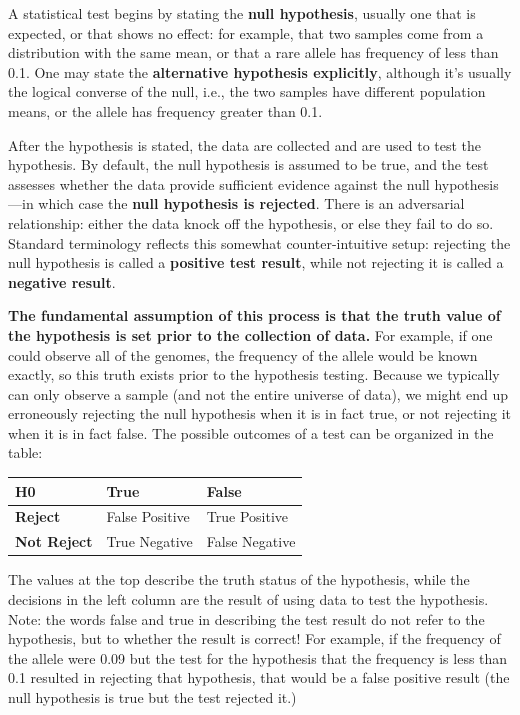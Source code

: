 \documentclass[
  letterpaper,
  DIV=11,
  numbers=noendperiod]{scrreprt}
\begin{document}
A statistical test begins by stating the \textbf{null hypothesis},
usually one that is expected, or that shows no effect: for example, that
two samples come from a distribution with the same mean, or that a rare
allele has frequency of less than 0.1. One may state the
\textbf{alternative hypothesis explicitly}, although it's usually the
logical converse of the null, i.e., the two samples have different
population means, or the allele has frequency greater than 0.1.

After the hypothesis is stated, the data are collected and are used to
test the hypothesis. By default, the null hypothesis is assumed to be
true, and the test assesses whether the data provide sufficient evidence
against the null hypothesis---in which case the \textbf{null hypothesis
is rejected}. There is an adversarial relationship: either the data
knock off the hypothesis, or else they fail to do so. Standard
terminology reflects this somewhat counter-intuitive setup: rejecting
the null hypothesis is called a \textbf{positive test result}, while not
rejecting it is called a \textbf{negative result}.

\textbf{The fundamental assumption of this process is that the truth
value of the hypothesis is set prior to the collection of data.} For
example, if one could observe all of the genomes, the frequency of the
allele would be known exactly, so this truth exists prior to the
hypothesis testing. Because we typically can only observe a sample (and
not the entire universe of data), we might end up erroneously rejecting
the null hypothesis when it is in fact true, or not rejecting it when it
is in fact false. The possible outcomes of a test can be organized in
the table:

\begin{longtable}[]{@{}lll@{}}
\toprule()
H0 & True & False \\
\midrule()
\endhead
\textbf{Reject} & False Positive & True Positive \\
\textbf{Not Reject} & True Negative & False Negative \\
\bottomrule()
\end{longtable}

The values at the top describe the truth status of the hypothesis, while
the decisions in the left column are the result of using data to test
the hypothesis. Note: the words false and true in describing the test
result do not refer to the hypothesis, but to whether the result is
correct! For example, if the frequency of the allele were 0.09 but the
test for the hypothesis that the frequency is less than 0.1 resulted in
rejecting that hypothesis, that would be a false positive result (the
null hypothesis is true but the test rejected it.)
\end{document}

